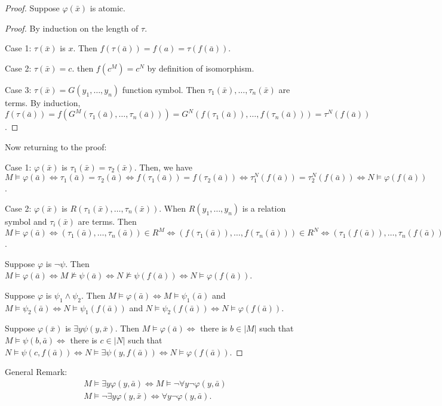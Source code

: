 \documentclass{report}
\begin{document}
\begin{proof}
    Suppose $\varphi(\bar x)$ is atomic. 

    \begin{proof}
        By induction on the length of $\tau$. 

        Case 1: $\tau(\bar x)$ is $x$. Then $f(\tau(\bar a)) = f(a) = \tau(f(\bar a))$.

        Case 2: $\tau(\bar x) = c$. then $f(c^M) = c^N$ by definition of isomorphism. 

        Case 3: $\tau(\bar x) = G(y_1, \ldots, y_n)$ function symbol. Then $\tau_1(\bar x), \ldots, \tau_n(\bar x)$ are terms. By induction, $f(\tau(\bar a)) = f(G^M(\tau_1(\bar a), \ldots, \tau_n(\bar a))) = G^N(f(\tau_1(\bar a)), \ldots, f(\tau_n(\bar a))) = \tau^N(f(\bar a))$.
    \end{proof}
    Now returning to the proof:

    Case 1: $\varphi(\bar x)$ is $\tau_1(\bar x) = \tau_2(\bar x)$. Then, we have $M \models \varphi(\bar a) \iff \tau_1(\bar a) = \tau_2(\bar a) \iff f(\tau_1(\bar a)) = f(\tau_2(\bar a)) \iff \tau_1^N(f(\bar a)) = \tau_2^N(f(\bar a)) \iff N \models \varphi(f(\bar a))$.

    Case 2: $\varphi(\bar x)$ is $R(\tau_1(\bar x), \ldots, \tau_n(\bar x))$. When $R(y_1, \ldots, y_n)$ is a relation symbol and $\tau_i (\bar x)$ are terms. Then $M \models \varphi(\bar a) \iff (\tau_1(\bar a), \ldots, \tau_n(\bar a)) \in R^M \iff (f(\tau_1(\bar a)), \ldots, f(\tau_n(\bar a))) \in R^N \iff (\tau_1(f(\bar a)), \ldots, \tau_n(f(\bar a))) \iff N \models \varphi(f(\bar a))$.

    Suppose $\varphi$ is $\lnot \psi$. Then $M \models \varphi(\bar a) \iff M \not\models \psi(\bar a) \iff N \not\models \psi(f(\bar a)) \iff N \models \varphi(f(\bar a))$.

    Suppose $\varphi$ is $\psi_1 \land \psi_2$. Then $M \models \varphi(\bar a) \iff M \models \psi_1(\bar a)$ and $M \models \psi_2(\bar a) \iff N \models \psi_1(f(\bar a))$ and $N \models \psi_2(f(\bar a)) \iff N \models \varphi(f(\bar a))$.

    Suppose $\varphi(\bar x)$ is $\exists y \psi(y, \bar x)$. Then $M \models \varphi(\bar a) \iff $ there is $b \in |M|$ such that $M \models \psi(b, \bar a) \iff$ there is $c \in |N|$ such that $N \models \psi(c, f(\bar a)) \iff N \models \exists \psi(y, f(\bar a)) \iff N \models \varphi(f(\bar a))$. 
\end{proof}
\noindent General Remark:
\begin{align*}
    M \models  \exists y \varphi(y, \bar a) \iff M \models \neg \forall y \neg \varphi(y, \bar a) \\
    M \models \neg \exists y \varphi(y, \bar x) \iff \forall y \neg \varphi(y, \bar a).
\end{align*}
\end{document}

